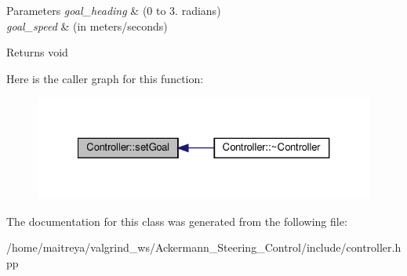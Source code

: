 \begin{DoxyParams}{Parameters}
{\em goal\+\_\+heading} & (0 to 3. radians) \\
\hline
{\em goal\+\_\+speed} & (in meters/seconds) \\
\hline
\end{DoxyParams}
\begin{DoxyReturn}{Returns}
void 
\end{DoxyReturn}
Here is the caller graph for this function\+:
\nopagebreak
\begin{figure}[H]
\begin{center}
\leavevmode
\includegraphics[width=327pt]{classController_ad41ca82c11e43a21d32c23ad159e747b_icgraph}
\end{center}
\end{figure}


The documentation for this class was generated from the following file\+:\begin{DoxyCompactItemize}
\item 
/home/maitreya/valgrind\+\_\+ws/\+Ackermann\+\_\+\+Steering\+\_\+\+Control/include/controller.\+hpp\end{DoxyCompactItemize}
